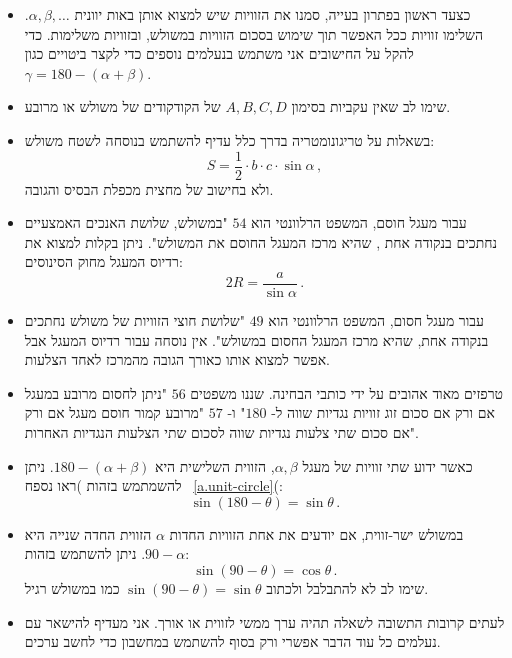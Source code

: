 \begin{itemize}

\item
כצעד ראשון בפתרון בעייה, סמנו את הזוויות שיש למצוא אותן באות יוונית
$\alpha,\beta,\ldots$.
השלימו זוויות ככל האפשר תוך שימוש בסכום הזוויות במשולש, ובזוויות משלימות. כדי להקל על החישובים אני משתמש בנעלמים נוספים כדי לקצר ביטויים כגון
$\gamma=180-(\alpha+\beta)$.

\item
שימו לב שאין עקביות בסימון 
$A,B,C,D$
של הקודקודים של משולש או מרובע.


\item 
בשאלות על טריגונומטריה בדרך כלל עדיף להשתמש בנוסחה לשטח משולש:
\[
S=\frac{1}{2}\cdot b \cdot c \cdot\sin \alpha\,,
\]
ולא בחישוב של מחצית מכפלת הבסיס והגובה.

\item
עבור מעגל חוסם, המשפט הרלוונטי הוא
$54$
"במשולש, שלושת האנכים האמצעיים נחתכים בנקודה אחת , שהיא מרכז המעגל החוסם את המשולש". ניתן בקלות למצוא את רדיוס המעגל מחוק הסינוסים:
\[
2R=\frac{a}{\sin\alpha}\,.
\]
\vspace{-4ex}
\item
עבור מעגל חסום, המשפט הרלוונטי הוא
$49$
"שלושת חוצי הזוויות של משולש נחתכים בנקודה אחת, שהיא מרכז המעגל החסום במשולש". אין נוסחה עבור רדיוס המעגל אבל אפשר למצוא אותו כאורך הגובה מהמרכז לאחד הצלעות.


\item 
טרפזים מאוד אהובים על ידי כותבי הבחינה. שננו משפטים
$56$
"ניתן לחסום מרובע במעגל אם ורק אם סכום זוג זוויות נגדיות שווה ל-%
$180$"
ו-%
$57$
"מרובע קמור חוסם מעגל אם ורק אם סכום שתי צלעות נגדיות שווה לסכום שתי הצלעות הנגדיות האחרות".

\item
כאשר ידוע שתי זוויות של מעגל
$\alpha,\beta$,
 הזווית השלישית היא
$180-(\alpha+\beta)$.
ניתן להשמתמש בזהות )ראו נספח~%
\ref{a.unit-circle}(:
\[
\sin (180-\theta) = \sin \theta\,.
\]
\vspace{-5ex}

\item
במשולש ישר-זווית, אם יודעים את אחת הזוויות החדות 
$\alpha$
הזווית החדה שנייה היא
$90-\alpha$.
ניתן להשתמש בזהות:
\[
\sin (90-\theta) = \cos \theta\,.
\]
שימו לב לא להתבלבל ולכתוב
$\sin (90-\theta) = \sin\theta$
כמו במשולש רגיל.
\item
לעתים קרובות התשובה לשאלה תהיה ערך ממשי לזווית או אורך. אני מעדיף להישאר עם נעלמים כל עוד הדבר אפשרי ורק בסוף להשתמש במחשבון כדי לחשב ערכים.


\end{itemize}


